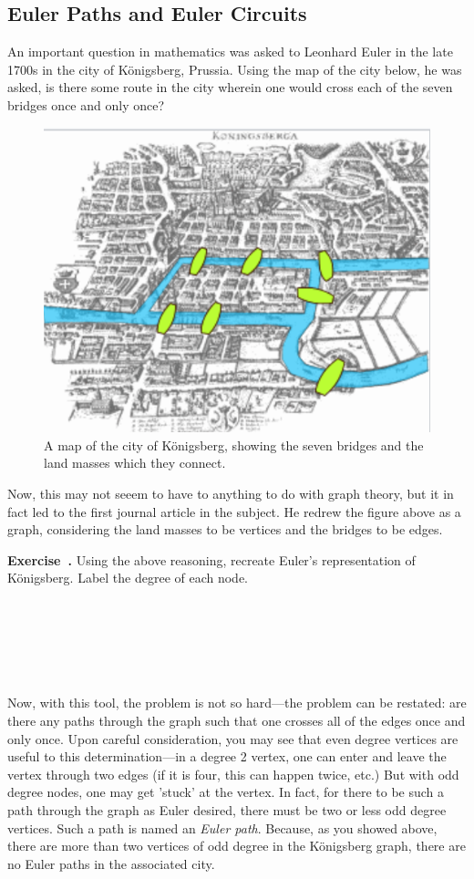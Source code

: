 \documentclass[12pt]{article}
\newcounter{exercise}[section]
\newenvironment{exercise}[1][]{\refstepcounter{exercise}\par\medskip
	\noindent \textbf{Exercise~\thesection.\theexercise #1} \rmfamily}{\medskip}
\begin{document}
\subsection{Euler Paths and Euler Circuits}
An important question in mathematics was asked to Leonhard Euler in the late 1700s in the city of Königsberg, Prussia. Using the map of the city below, he was asked, is there some route in the city wherein one would cross each of the seven bridges once and only once?
\begin{figure}[htbp]
\begin{center}
\includegraphics[]{euler.png}
\caption{A map of the city of Königsberg, showing the seven bridges and the land masses which they connect.}
\label{default}
\end{center}
\end{figure}
Now, this may not seeem to have to anything to do with graph theory, but it in fact led to the first journal article in the subject. He redrew the figure above as a graph, considering the land masses to be vertices and the bridges to be edges.
\begin{exercise}
Using the above reasoning, recreate Euler's representation of Königsberg. Label the degree of each node.
\\
\\
\\
\\
\\
\\
\\
\end{exercise}
Now, with this tool, the problem is not so hard---the problem can be restated: are there any paths through the graph such that one crosses all of the edges once and only once. Upon careful consideration, you may see that even degree vertices are useful to this determination---in a degree 2 vertex, one can enter and leave the vertex through two edges (if it is four, this can happen twice, etc.) But with odd degree nodes, one may get 'stuck' at the vertex. In fact, for there to be such a path through the graph as Euler desired, there must be two or less odd  degree vertices. Such a path is named an \emph{Euler path}.  Because, as you showed above, there are more than two vertices of odd degree in the Königsberg graph, there are no Euler paths in the associated city.
\end{document}
